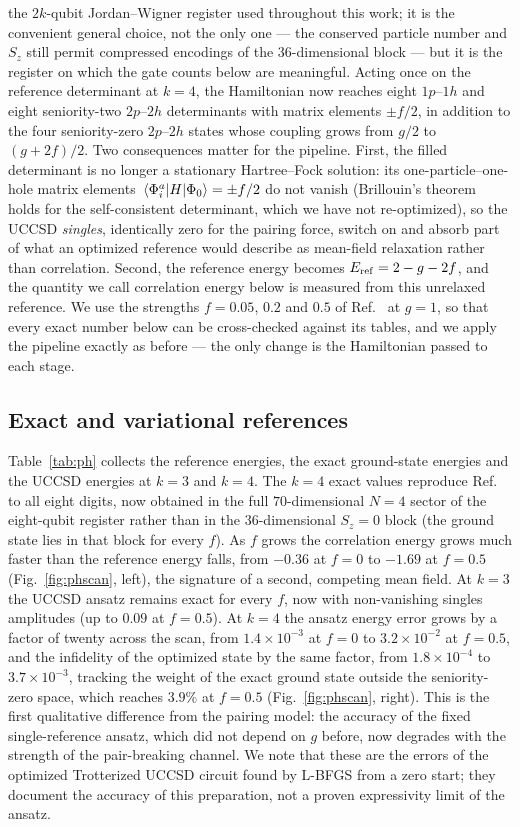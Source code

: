 \documentclass[
  aps,            %
  prc,            %
  reprint,        %
  superscriptaddress,
  floatfix,
  nofootinbib
]{revtex4-2}
\begin{document}
the $2k$-qubit Jordan--Wigner register used throughout this work; it is the
convenient general choice, not the only one --- the conserved particle number
and $S_z$ still permit compressed encodings of the $36$-dimensional block ---
but it is the register on which the gate counts below are meaningful.  Acting
once on the reference determinant at $k=4$, the Hamiltonian now reaches eight
$1p$--$1h$ and eight seniority-two $2p$--$2h$ determinants with matrix elements
$\pm f/2$, in addition to the four seniority-zero $2p$--$2h$ states whose
coupling grows from $g/2$ to $(g+2f)/2$.  Two consequences matter for the
pipeline.  First, the filled determinant is no longer a stationary
Hartree--Fock solution: its one-particle--one-hole matrix elements
$\mel{\Phi_i^a}{H}{\Phi_0}=\pm f/2$ do not vanish (Brillouin's theorem holds
for the self-consistent determinant, which we have not re-optimized), so the
UCCSD \emph{singles}, identically zero for the pairing force, switch on and
absorb part of what an optimized reference would describe as mean-field
relaxation rather than correlation.  Second, the reference energy becomes
$E_{\rm ref}=2-g-2f$, and the quantity we call correlation energy below is
measured from this unrelaxed reference.  We use the strengths $f=0.05$, $0.2$ and $0.5$ of
Ref.~\cite{MHJbook} at $g=1$, so that every exact number below can be
cross-checked against its tables, and we apply the pipeline exactly as before
--- the only change is the Hamiltonian passed to each stage.

\subsection{Exact and variational references}
\label{sec:ph-bench}
Table~\ref{tab:ph} collects the reference energies, the exact ground-state
energies and the UCCSD energies at $k=3$ and $k=4$.  The $k=4$ exact values
reproduce Ref.~\cite{MHJbook} to all eight digits, now obtained in the full
$70$-dimensional $N=4$ sector of the eight-qubit register rather than in the
$36$-dimensional $S_z=0$ block (the ground state lies in that block for every
$f$).  As $f$ grows the correlation energy grows much faster than the
reference energy falls, from $-0.36$ at $f=0$ to $-1.69$ at $f=0.5$
(Fig.~\ref{fig:phscan}, left), the signature of a second, competing mean field.
At $k=3$ the UCCSD ansatz remains exact for every $f$, now with non-vanishing
singles amplitudes (up to $0.09$ at $f=0.5$).  At $k=4$ the ansatz energy
error grows by a factor of twenty across the scan, from $1.4\times10^{-3}$ at
$f=0$ to $3.2\times10^{-2}$ at $f=0.5$, and the infidelity of the optimized
state by the same factor, from $1.8\times10^{-4}$ to $3.7\times10^{-3}$,
tracking the weight of the exact ground state outside the seniority-zero
space, which reaches $3.9\%$ at $f=0.5$ (Fig.~\ref{fig:phscan}, right).  This
is the first qualitative difference from the pairing model: the accuracy of
the fixed single-reference ansatz, which did not depend on $g$ before, now
degrades with the strength of the pair-breaking channel.  We note that these
are the errors of the optimized Trotterized UCCSD circuit found by L-BFGS from
a zero start; they document the accuracy of this preparation, not a proven
expressivity limit of the ansatz.
\end{document}
